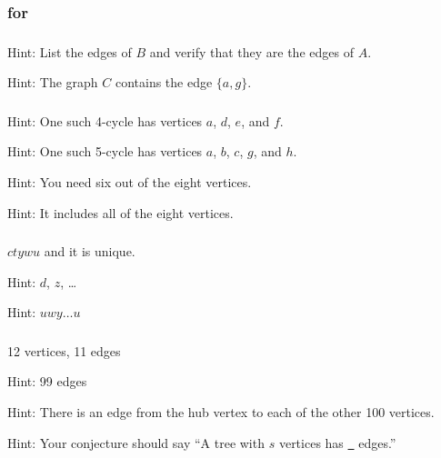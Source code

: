 
\subsubsection{\answers for  \subgraphtrees}

\subsubsection*{ \answers}
\begin{apart}
    \item Hint: List the edges of $B$ and verify that they are the edges of $A$.
    \item Hint: The graph $C$ contains the edge $\{a,g\}$.
\end{apart}

\subsubsection*{ \answers}
\begin{apart}
    \item Hint: One such 4-cycle has vertices $a$, $d$, $e$, and $f$.
    \item Hint: One such 5-cycle has vertices $a$, $b$, $c$, $g$, and $h$.
    \item Hint: You need six out of the eight vertices.
    \item Hint: It includes all of the eight vertices.
\end{apart}

\subsubsection*{ \answers}
\begin{apart}
    \item $ctywu$ and it is unique.
    \item Hint: $d$, $z$, \ldots 
    \item Hint: $uwy\ldots u$
\end{apart}

\subsubsection*{ \answers}
\begin{apart}
    \item 12 vertices, 11 edges
    \item Hint: 99 edges
    \item Hint: There is an edge from the hub vertex to each of the other 100 vertices.
    \item Hint: Your conjecture should say ``A tree with $s$ vertices has \underline{\quad~} edges.''
\end{apart}

